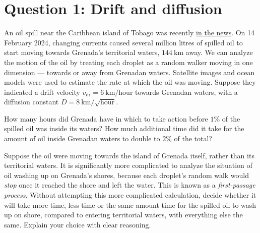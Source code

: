 \documentclass[12 pt]{article} %
\newcommand{\vdr}{\ensuremath{v_{\mathrm{dr}}} }
\newcommand{\showmarks}[1]{\rightline{\texttt{[#1 marks]}}} %
\begin{document}
\newpage
\section*{Question 1: Drift and diffusion}
An oil spill near the Caribbean island of Tobago was recently \href{https://www.reuters.com/business/environment/tides-move-oil-spill-away-tobago-caribbean-cleanup-progresses-2024-02-14/}{in the news}.
On 14 February 2024, changing currents caused several million litres of spilled oil to start moving towards Grenada's territorial waters, $144~\mathrm{km}$ away. %
We can analyze the motion of the oil by treating each droplet as a random walker moving in one dimension --- towards or away from Grenadan waters.
Satellite images and ocean models were used to estimate the rate at which the oil was moving.
Suppose they indicated a drift velocity $\vdr = 6~\mathrm{km}/\mathrm{hour}$ towards Grenadan waters, with a diffusion constant $D = 8~\mathrm{km}/\sqrt{\mathrm{hour}}$. %

How many hours did Grenada have in which to take action before $1\%$ of the spilled oil was inside its waters?
How much additional time did it take for the amount of oil inside Grenadan waters to double to $2\%$ of the total?

\showmarks{20}

Suppose the oil were moving towards the island of Grenada itself, rather than its territorial waters.
It is significantly more complicated to analyze the situation of oil washing up on Grenada's shores, because each droplet's random walk would \textit{stop} once it reached the shore and left the water.
This is known as a \textit{first-passage process}.
Without attempting this more complicated calculation, decide whether it will take more time, less time or the same amount time for the spilled oil to wash up on shore, compared to entering territorial waters, with everything else the same.
Explain your choice with clear reasoning.

\showmarks{6}
\end{document}

